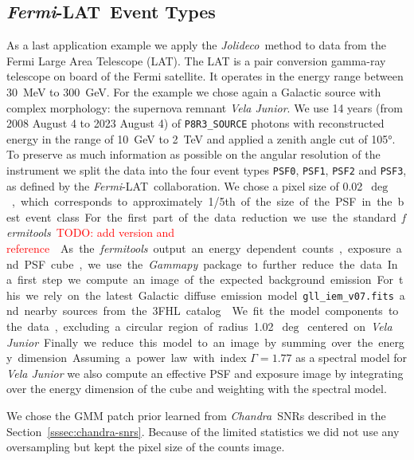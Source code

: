 \documentclass[twocolumn]{aastex631}
\newcommand{\chandra}{\textit{Chandra}~}
\newcommand{\fermi}{\textit{Fermi}-LAT~}
\newcommand{\jolideco}{\textit{Jolideco}~}
\newcommand{\todo}[1]{\textcolor{red}{TODO: #1}\PackageWarning{TODO:}{#1!}}
\begin{document}
    \subsection{\fermi Event Types}
    As a last application example we apply the \jolideco method to data from the Fermi Large Area Telescope (LAT).
    The LAT is a pair conversion gamma-ray telescope on board of the Fermi satellite. It operates in the energy range between \qty[mode = text]{30}{MeV} to  \qty[mode = text]{300}{GeV}. For the example we chose again a Galactic source with complex morphology: the supernova remnant \textit{Vela Junior}. We use 14 years (from 2008 August 4 to 2023 August 4) of \texttt{P8R3\_SOURCE} photons with reconstructed energy in the range of \qty[mode = text]{10}{GeV} to  \qty[mode = text]{2}{TeV} and applied a zenith angle cut of \ang{105}. To preserve as much information as possible on the angular resolution of the instrument we split the data into the four event types \texttt{PSF0}, \texttt{PSF1}, \texttt{PSF2} and \texttt{PSF3}, as
    defined by the \fermi collaboration. We chose a pixel size of \qty[mode = text]{0.02}{$\deg$}, which corresponds to approximately 1/5th of the size of the PSF in the best event class. For the first part of the data reduction we use the standard \textit{fermitools} \todo{add version and reference}.
    
    As the \textit{fermitools} output an energy dependent counts, exposure and PSF cube, we use the \textit{Gammapy} package to further reduce the data. In a first step we compute an image of the expected background emission. For this we rely on the latest Galactic diffuse emission model \texttt{gll\_iem\_v07.fits} and nearby sources from the 3FHL catalog \cite{Ajello2017}. We fit the model components to the data, excluding a circular region of radius \qty[mode = text]{1.02}{$\deg$} centered on \textit{Vela Junior}. Finally we reduce this model to an image by summing over the energy dimension.
    
    Assuming a power law with index $\Gamma=1.77$ \citep{Ajello2017} as a spectral model for \textit{Vela Junior} we also compute an effective PSF and exposure image by integrating over the energy dimension of the cube and weighting with the spectral model.
    
    We chose the GMM patch prior learned from \chandra SNRs described in the Section~\ref{sssec:chandra-snrs}. Because of the limited statistics we did not use any oversampling but kept the pixel size of the counts image.
    
\end{document}
